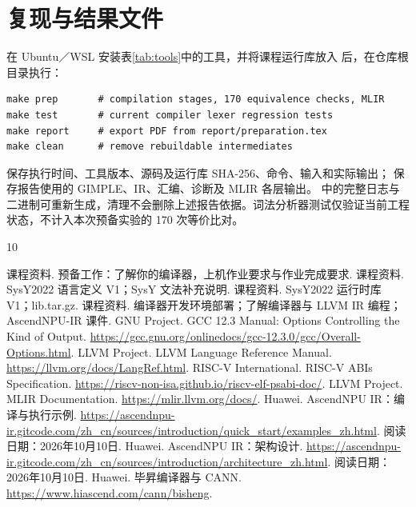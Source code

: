 \documentclass[UTF8,a4paper,10pt,fontset=fandol]{ctexart}
\renewcommand{\sectionmark}[1]{\markboth{\chinese{section}、#1}{}}
\begin{document}
\appendix
{}
\renewcommand{\sectionmark}[1]{\markboth{附录\Alph{section}\quad #1}{}}
\section{复现与结果文件}
在 Ubuntu／WSL 安装表\ref{tab:tools}中的工具，并将课程运行库放入  后，在仓库根目录执行：
\par\noindent\begin{minipage}{\linewidth}
\begin{lstlisting}[numbers=none]
make prep       # compilation stages, 170 equivalence checks, MLIR
make test       # current compiler lexer regression tests
make report     # export PDF from report/preparation.tex
make clean      # remove rebuildable intermediates
\end{lstlisting}
\end{minipage}\par
{} 保存执行时间、工具版本、源码及运行库 SHA-256、命令、输入和实际输出； 保存报告使用的 GIMPLE、IR、汇编、诊断及 MLIR 各层输出。 中的完整日志与二进制可重新生成，清理不会删除上述报告依据。词法分析器测试仅验证当前工程状态，不计入本次预备实验的 170 次等价比对。

\clearpage
\begin{thebibliography}{10}
 课程资料. 预备工作：了解你的编译器，上机作业要求与作业完成要求.
 课程资料. SysY2022 语言定义 V1；SysY 文法补充说明.
 课程资料. SysY2022 运行时库 V1；lib.tar.gz.
 课程资料. 编译器开发环境部署；了解编译器与 LLVM IR 编程；AscendNPU-IR 课件.
 GNU Project. GCC 12.3 Manual: Options Controlling the Kind of Output. \url{https://gcc.gnu.org/onlinedocs/gcc-12.3.0/gcc/Overall-Options.html}.
 LLVM Project. LLVM Language Reference Manual. \url{https://llvm.org/docs/LangRef.html}.
 RISC-V International. RISC-V ABIs Specification. \url{https://riscv-non-isa.github.io/riscv-elf-psabi-doc/}.
 LLVM Project. MLIR Documentation. \url{https://mlir.llvm.org/docs/}.
 Huawei. AscendNPU IR：编译与执行示例. \url{https://ascendnpu-ir.gitcode.com/zh_cn/sources/introduction/quick_start/examples_zh.html}. 阅读日期：2026年10月10日.
 Huawei. AscendNPU IR：架构设计. \url{https://ascendnpu-ir.gitcode.com/zh_cn/sources/introduction/architecture_zh.html}. 阅读日期：2026年10月10日.
 Huawei. 毕昇编译器与 CANN. \url{https://www.hiascend.com/cann/bisheng}.
\end{thebibliography}
\end{document}
